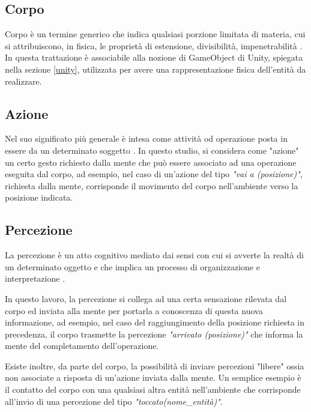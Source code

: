 \subsection{Corpo}

Corpo è un termine generico che indica qualsiasi porzione limitata di materia, cui si attribuiscono, in fisica, le proprietà di estensione, divisibilità, impenetrabilità \cite{treccani}.
In questa trattazione è associabile alla nozione di GameObject di Unity, spiegata nella sezione \ref{unity}, utilizzata per avere una rappresentazione fisica dell'entità da realizzare.

\subsection{Azione}

Nel suo significato più generale è intesa come attività od operazione posta in essere da un determinato soggetto \cite{treccani}.
In questo studio, si considera come "azione" un certo gesto richiesto dalla mente che può essere associato ad una operazione eseguita dal corpo, ad esempio, nel
caso di un'azione del tipo \textit{"vai a (posizione)"}, richiesta dalla mente, corrisponde il movimento del corpo nell'ambiente verso la posizione indicata.

\subsection{Percezione}

La percezione è un atto cognitivo mediato dai sensi con cui si avverte la realtà di un determinato oggetto e che implica un processo di organizzazione e interpretazione \cite{treccani}.

\medskip

In questo lavoro, la percezione si collega ad una certa sensazione rilevata dal corpo ed inviata alla mente per portarla a conoscenza di questa nuova informazione, ad esempio, nel caso del raggiungimento della posizione richiesta in precedenza, il corpo trasmette la percezione \textit{"arrivato (posizione)"} che informa la mente del completamento dell'operazione.

\medskip

Esiste inoltre, da parte del corpo, la possibilità di inviare percezioni "libere" ossia non associate a risposta di un'azione inviata dalla mente. Un semplice esempio è il contatto del corpo con una qualsiasi altra entità nell'ambiente che corrisponde all'invio di una percezione del tipo \textit{"toccato(nome\_entità)"}.

